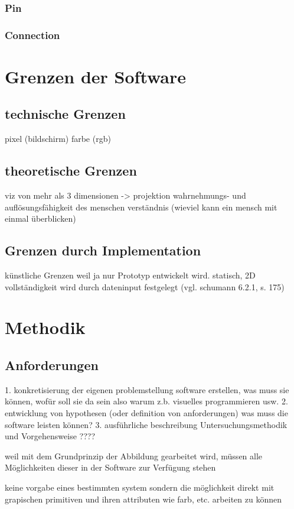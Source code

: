 \documentclass[a4paper, 12pt, onepage, pdftex, headsepline, footsepline]{scrreprt}
\begin{document}
\subsection{Pin}
\subsection{Connection}

\chapter{Grenzen der Software}
\section{technische Grenzen}
pixel (bildschirm)
farbe (rgb)
\section{theoretische Grenzen}
viz von mehr als 3 dimensionen -> projektion
wahrnehmungs- und auflösungsfähigkeit des menschen
verständnis (wieviel kann ein mensch mit einmal überblicken)
\section{Grenzen durch Implementation}
künstliche Grenzen weil ja nur Prototyp entwickelt wird.
statisch, 2D vollständigkeit wird durch dateninput festgelegt (vgl. schumann 6.2.1, s. 175)


\chapter{Methodik}
\section{Anforderungen}
1. konkretisierung der eigenen problemstellung
software erstellen, was muss sie können, wofür soll sie da sein
also warum z.b. visuelles programmieren usw.
2. entwicklung von hypothesen (oder definition von anforderungen)
was muss die software leisten können?
3. ausführliche beschreibung Untersuchungsmethodik und Vorgehensweise
????

weil mit dem Grundprinzip der Abbildung gearbeitet wird, müssen alle Möglichkeiten dieser in der Software zur Verfügung stehen

keine vorgabe eines bestimmten system sondern die möglichkeit direkt mit grapischen primitiven und ihren attributen wie farb, etc. arbeiten zu können
\end{document}
